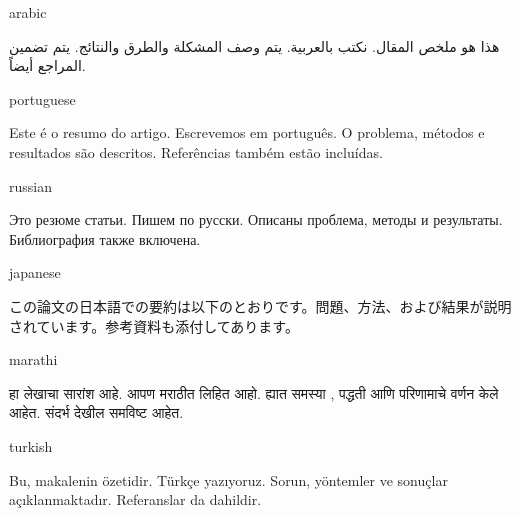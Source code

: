 \documentclass[colorlinks,nofoot,spanish,japanese,russian,greek,ukrainian,vietnamese,french,portuguese,turkish,polish,indonesian,italian,german,latin,serbianc,bidi=basic]{asmeconf}
\begin{document}
\begin{selectlanguage}{arabic}%
\begin{abstract*}\upshape
هذا هو ملخص المقال. نكتب بالعربية. يتم وصف المشكلة والطرق والنتائج. يتم تضمين المراجع أيضاً. 
\end{abstract*}
\end{selectlanguage}%

{\NotoSerif
\begin{selectlanguage}{portuguese}
\begin{abstract*}
Este é o resumo do artigo. Escrevemos em português. O problema, métodos e resultados são descritos. Referências também estão incluídas.
\end{abstract*}
\end{selectlanguage}%
}%

\begin{selectlanguage}{russian}
\begin{abstract*}
Это резюме статьи. Пишем по русски. Описаны проблема, методы и результаты. Библиография также включена.
\end{abstract*}
\end{selectlanguage}%

\begin{selectlanguage}{japanese}
\begin{abstract*}
この論文の日本語での要約は以下のとおりです。問題、方法、および結果が説明されています。参考資料も添付してあります。
\end{abstract*}
\end{selectlanguage}%

\begin{selectlanguage}{marathi}
\begin{abstract*}
हा लेखाचा सारांश आहे. आपण मराठीत लिहित आहो. ह्यात समस्या , पद्धती आणि परिणामाचे वर्णन केले आहेत. संदर्भ देखील समविष्ट आहेत. 
\end{abstract*}
\end{selectlanguage}%

{\NotoSerif
\begin{selectlanguage}{turkish}
\begin{abstract*}{\NotoSerifItalns
Bu, makalenin özetidir. Türkçe yazıyoruz. Sorun, yöntemler ve sonuçlar açıklanmaktadır. Referanslar da dahildir.}%
\end{abstract*}%
\end{selectlanguage}%
}%
\end{document}
